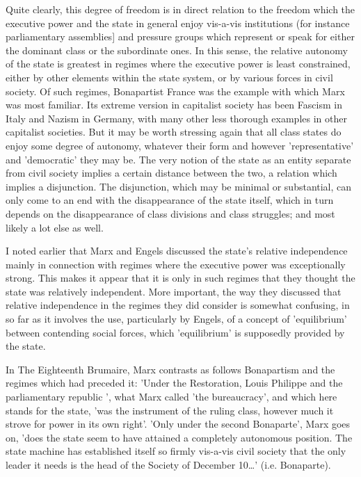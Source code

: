 Quite clearly, this degree of freedom is in direct relation to the freedom which the executive power and the state in general enjoy vis-a-vis institutions (for instance parliamentary assemblies] and pressure groups which represent or speak for either the dominant class or the subordinate ones. In this sense, the relative autonomy of the state is greatest in regimes where the executive power is least constrained, either by other elements within the state system, or by various forces in civil society. Of such regimes, Bonapartist France was the example with which Marx was most familiar. Its extreme version in capitalist society has been Fascism in Italy and Nazism in Germany, with many other less thorough examples in other capitalist societies. But it may be worth stressing again that all class states do enjoy some degree of autonomy, whatever their form and however 'representative' and 'democratic' they may be. The very notion of the state as an entity separate from civil society implies a certain distance between the two, a relation which implies a disjunction. The disjunction, which may be minimal or substantial, can only come to an end with the disappearance of the state itself, which in turn depends on the disappearance of class divisions and class struggles; and most likely a lot else as well.

I noted earlier that Marx and Engels discussed the state's relative independence mainly in connection with regimes where the executive power was exceptionally strong. This makes it appear that it is only in such regimes that they thought the state was relatively independent. More important, the way they discussed that relative independence in the regimes they did consider is somewhat confusing, in so far as it involves the use, particularly by Engels, of a concept of 'equilibrium' between contending social forces, which 'equilibrium' is supposedly provided by the state.

In The Eighteenth Brumaire, Marx contrasts as follows Bonapartism and the regimes which had preceded it: 'Under the Restoration, Louis Philippe and the parliamentary republic ', what Marx called 'the bureaucracy', and which here stands for the state, 'was the instrument of the ruling class, however much it strove for power in its own right'. 'Only under the second Bonaparte', Marx goes on, 'does the state seem to have attained a completely autonomous position. The state machine has established itself so firmly vis-a-vis civil society that the only leader it needs is the head of the Society of December 10\dots{}' (i.e. Bonaparte).

